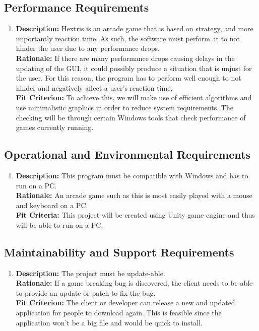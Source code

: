 \documentclass[12pt, titlepage]{article}
\begin{document}
\subsection{Performance Requirements}
\begin{enumerate}[label=P\arabic*]
\item \textbf{Description:} Hextris is an arcade game that is based on strategy, and more importantly reaction time. As such, the software must perform at \textgamma \space to not hinder the user due to any performance drops.\\
\textbf{Rationale:} If there are many performance drops causing delays in the updating of the GUI, it could possibly produce a situation that is unjust for the user. For this reason, the program has to perform well enough to not hinder and negatively affect a user's reaction time.\\
\textbf{Fit Criterion:} To achieve this, we  will make use of efficient algorithms and use minimalistic graphics in order to reduce system requirements. The checking will be through certain Windows tools that check performance of games currently running. 

\end{enumerate}

\subsection{Operational and Environmental Requirements}
\begin{enumerate}[label=OR\arabic*]
\item \textbf{Description:} This program must be compatible with Windows and has to run on a PC.\\
\textbf{Rationale:} An arcade game such as this is most easily played with a mouse and keyboard on a PC.\\
\textbf{Fit Criteria:} This project will be created using Unity game engine and thus will be able to run on a PC.

\end{enumerate}


\subsection{Maintainability and Support Requirements}
\begin{enumerate}[label=M\arabic*]
\item \textbf{Description:} The project must be update-able.\\
\textbf{Rationale:} If a game breaking bug is discovered, the client needs to be able to provide an update or patch to fix the bug. \\
\textbf{Fit Criterion:} The client or developer can release a new and updated application for people to download again. This is feasible since the application won't be a big file and would be quick to install.

\end{enumerate}
\end{document}
